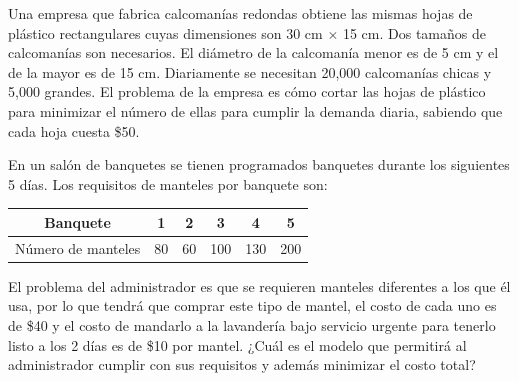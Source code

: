 \begin{Ejer}
Una empresa que fabrica calcoman\'ias redondas obtiene las mismas hojas de pl\'astico rectangulares cuyas dimensiones son 30 cm $\times$ 15 cm. Dos tama\~nos de calcoman\'ias son necesarios. El di\'ametro de la calcoman\'ia menor es de 5 cm y el de la mayor es de 15 cm. Diariamente se necesitan 20,000 calcoman\'ias chicas y 5,000 grandes. El problema de la empresa es c\'omo cortar las hojas de pl\'astico para minimizar el n\'umero de ellas para cumplir la demanda diaria, sabiendo que cada hoja cuesta \$50.
\end{Ejer}



\begin{Ejer}
En un sal\'on de banquetes se tienen programados banquetes durante los siguientes 5 d\'ias. Los requisitos de manteles por banquete son:

\begin{center}
\begin{tabular}{c|ccccc}
Banquete & 1 & 2 & 3 & 4 & 5 \\
\hline
N\'umero de manteles & 80 & 60 & 100 & 130 & 200 \\
\end{tabular}
\end{center}

El problema del administrador es que se requieren manteles diferentes a los que \'el usa, por lo que tendr\'a que comprar este tipo de mantel, el costo de cada uno es de \$40 y el costo de mandarlo a la lavander\'ia bajo servicio urgente para tenerlo listo a los 2 d\'ias es de \$10 por mantel. ¿Cu\'al es el modelo que permitir\'a al administrador cumplir con sus requisitos y adem\'as minimizar el costo total?
\end{Ejer}

